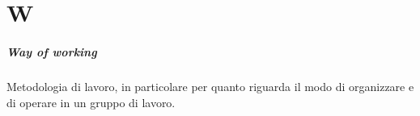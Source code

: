 \chapter{W}

\paragraph*{Way of working}
Metodologia di lavoro, in particolare per quanto riguarda il modo di organizzare e di operare in un gruppo di lavoro.